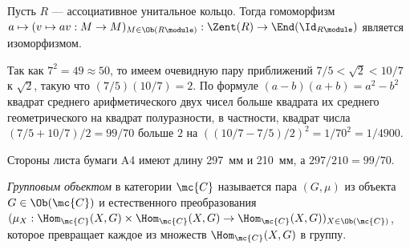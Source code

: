 \documentclass[
	extrafontsizes,
	11pt,
	hyphens,
]{memoir}
\begin{document}

\begin{observation}
Пусть \(R\) --- ассоциативное унитальное кольцо.
Тогда гомоморфизм
\(a \mapsto (v \mapsto av : M \to M)_{M \in \Ob(R\module)} : \Zent(R)
\to \End(\Id_{R\module})\)
является изоморфизмом.
\end{observation}

\begin{observation}
Так как \(7^2 = 49 \approx 50\), то имеем очевидную пару приближений \(7/5 < \sqrt{2} < 10/7\) к \(\sqrt{2}\), такую что \((7/5)(10/7) = 2\).%
\label{obs:SqrtTwoApprox}
По формуле \((a - b)(a + b) = a^2 - b^2\) квадрат среднего арифметического двух чисел больше квадрата их среднего геометрического на квадрат полуразности, в частности, квадрат числа \((7/5 + 10/7)/2 = 99/70\) больше \(2\) на \(((10/7 - 7/5)/2)^2 = 1 / 70^2 = 1 / 4900\).
\end{observation}

\begin{remark}
Стороны листа бумаги A4 имеют длину 297~мм и 210~мм, а \(297 / 210 = 99 / 70\).
\end{remark}

\begin{definition}
\emph{Групповым объектом}%
\label{def:GroupObject}
в категории \(\mc{C}\) называется пара \((G, \mu)\) из объекта \(G \in \Ob(\mc{C})\) и естественного преобразования
\((\mu_X : \Hom_{\mc{C}}(X,G) \times \Hom_{\mc{C}}(X,G) \to \Hom_{\mc{C}}(X,G))_{X \in \Ob(\mc{C})}\),
которое превращает каждое из множеств \(\Hom_{\mc{C}}(X, G)\) в группу.
\end{definition}
\end{document}
